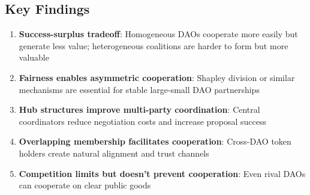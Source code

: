 \subsection{Key Findings}

\begin{enumerate}
    \item \textbf{Success-surplus tradeoff}: Homogeneous DAOs cooperate more easily but generate less value; heterogeneous coalitions are harder to form but more valuable

    \item \textbf{Fairness enables asymmetric cooperation}: Shapley division or similar mechanisms are essential for stable large-small DAO partnerships

    \item \textbf{Hub structures improve multi-party coordination}: Central coordinators reduce negotiation costs and increase proposal success

    \item \textbf{Overlapping membership facilitates cooperation}: Cross-DAO token holders create natural alignment and trust channels

    \item \textbf{Competition limits but doesn't prevent cooperation}: Even rival DAOs can cooperate on clear public goods
\end{enumerate}
